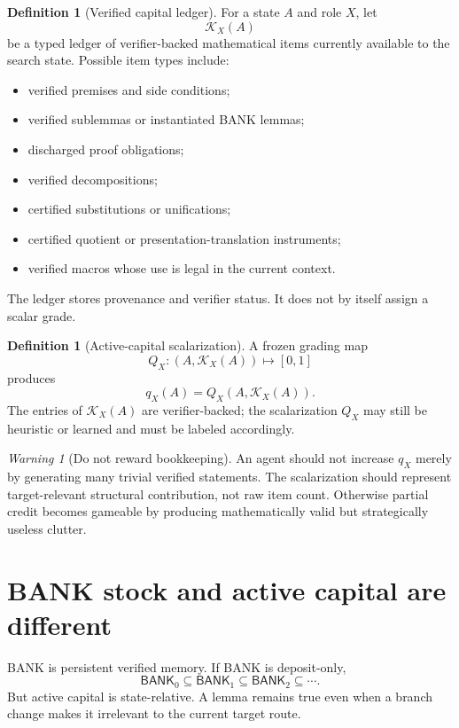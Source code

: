 \documentclass[11pt]{article}
\theoremstyle{definition}
\newtheorem{definition}[theorem]{Definition}
\theoremstyle{remark}
\newtheorem{warningnote}[theorem]{Warning}
\newcommand{\BANK}{\mathsf{BANK}}
\begin{document}
\begin{definition}[Verified capital ledger]
For a state $A$ and role $X$, let
\[
\mathcal K_X(A)
\]
be a typed ledger of verifier-backed mathematical items currently available to the search state. Possible item types include:
\begin{itemize}
\item verified premises and side conditions;
\item verified sublemmas or instantiated BANK lemmas;
\item discharged proof obligations;
\item verified decompositions;
\item certified substitutions or unifications;
\item certified quotient or presentation-translation instruments;
\item verified macros whose use is legal in the current context.
\end{itemize}
The ledger stores provenance and verifier status. It does not by itself assign a scalar grade.
\end{definition}

\begin{definition}[Active-capital scalarization]
A frozen grading map
\[
Q_X:(A,\mathcal K_X(A))\mapsto[0,1]
\]
produces
\[
\boxed{q_X(A)=Q_X(A,\mathcal K_X(A)).}
\]
The entries of $\mathcal K_X(A)$ are verifier-backed; the scalarization $Q_X$ may still be heuristic or learned and must be labeled accordingly.
\end{definition}

\begin{warningnote}[Do not reward bookkeeping]
An agent should not increase $q_X$ merely by generating many trivial verified statements. The scalarization should represent target-relevant structural contribution, not raw item count. Otherwise partial credit becomes gameable by producing mathematically valid but strategically useless clutter.
\end{warningnote}

\section{BANK stock and active capital are different}

BANK is persistent verified memory. If BANK is deposit-only,
\[
\BANK_0\subseteq\BANK_1\subseteq\BANK_2\subseteq\cdots.
\]
But active capital is state-relative. A lemma remains true even when a branch change makes it irrelevant to the current target route.
\end{document}
